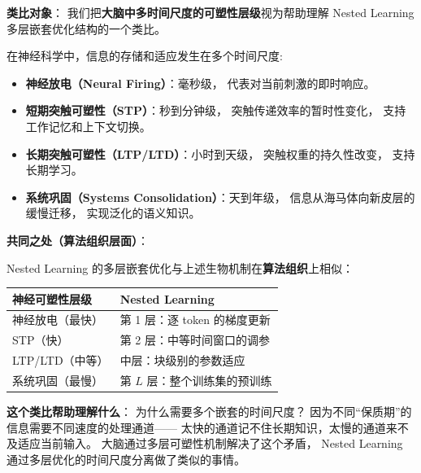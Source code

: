 \begin{neurosciencebox}[title=神经科学直觉：多时间尺度的神经可塑性层级]

\textbf{类比对象}：
我们把\textbf{大脑中多时间尺度的可塑性层级}视为帮助理解
Nested Learning 多层嵌套优化结构的一个类比。

在神经科学中，信息的存储和适应发生在多个时间尺度:
\begin{itemize}
  \item \textbf{神经放电（Neural Firing）}：毫秒级，
        代表对当前刺激的即时响应。
  \item \textbf{短期突触可塑性（STP）}：秒到分钟级，
        突触传递效率的暂时性变化，
        支持工作记忆和上下文切换。
  \item \textbf{长期突触可塑性（LTP/LTD）}：小时到天级，
        突触权重的持久性改变，
        支持长期学习。
  \item \textbf{系统巩固（Systems Consolidation）}：天到年级，
        信息从海马体向新皮层的缓慢迁移，
        实现泛化的语义知识。
\end{itemize}

\textbf{共同之处（算法组织层面）}：

Nested Learning 的多层嵌套优化与上述生物机制在\textbf{算法组织}上相似：
\begin{center}
\begin{tabular}{p{4cm} p{4cm}}
\toprule
\textbf{神经可塑性层级} & \textbf{Nested Learning} \\
\midrule
神经放电（最快） & 第 1 层：逐 token 的梯度更新 \\
STP（快） & 第 2 层：中等时间窗口的调参 \\
LTP/LTD（中等） & 中层：块级别的参数适应 \\
系统巩固（最慢） & 第 $L$ 层：整个训练集的预训练 \\
\bottomrule
\end{tabular}
\end{center}

\textbf{这个类比帮助理解什么}：
为什么需要多个嵌套的时间尺度？
因为不同``保质期''的信息需要不同速度的处理通道——
太快的通道记不住长期知识，太慢的通道来不及适应当前输入。
大脑通过多层可塑性机制解决了这个矛盾，
Nested Learning 通过多层优化的时间尺度分离做了类似的事情。

\end{neurosciencebox}

